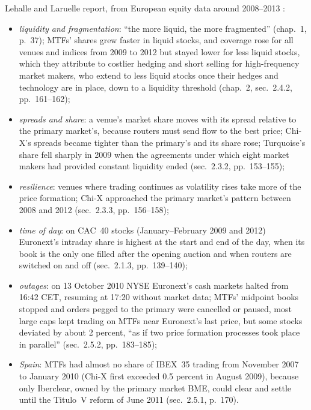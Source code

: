 \begin{qfevidence}\label{ev:european-fragmentation-evidence}
 Lehalle and Laruelle report, from European equity data around 2008--2013 \citep[chaps.~1--2]{alpha-laruelle}:
\begin{itemize}
\item \emph{liquidity and fragmentation}: ``the more liquid, the more fragmented'' (chap.~1, p.~37); MTFs' shares grew faster in liquid stocks, and coverage rose for all venues and indices from 2009 to 2012 but stayed lower for less liquid stocks, which they attribute to costlier hedging and short selling for high-frequency market makers, who extend to less liquid stocks once their hedges and technology are in place, down to a liquidity threshold (chap.~2, sec.~2.4.2, pp.~161--162);
\item \emph{spreads and share}: a venue's market share moves with its spread relative to the primary market's, because routers must send flow to the best price; Chi-X's spreads became tighter than the primary's and its share rose; Turquoise's share fell sharply in 2009 when the agreements under which eight market makers had provided constant liquidity ended (sec.~2.3.2, pp.~153--155);
\item \emph{resilience}: venues where trading continues as volatility rises take more of the price formation; Chi-X approached the primary market's pattern between 2008 and 2012 (sec.~2.3.3, pp.~156--158);
\item \emph{time of day}: on CAC~40 stocks (January--February 2009 and 2012) Euronext's intraday share is highest at the start and end of the day, when its book is the only one filled after the opening auction and when routers are switched on and off (sec.~2.1.3, pp.~139--140);
\item \emph{outages}: on 13 October 2010 NYSE Euronext's cash markets halted from 16:42 CET, resuming at 17:20 without market data; MTFs' midpoint books stopped and orders pegged to the primary were cancelled or paused, most large caps kept trading on MTFs near Euronext's last price, but some stocks deviated by about 2 percent, ``as if two price formation processes took place in parallel'' (sec.~2.5.2, pp.~183--185);
\item \emph{Spain}: MTFs had almost no share of IBEX~35 trading from November 2007 to January 2010 (Chi-X first exceeded 0.5 percent in August 2009), because only Iberclear, owned by the primary market BME, could clear and settle until the Titulo~V reform of June 2011 (sec.~2.5.1, p.~170).
\end{itemize}


\end{qfevidence}

